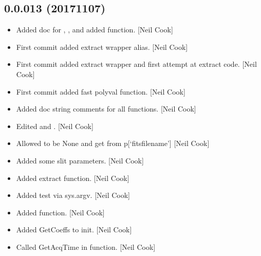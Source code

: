 \documentclass[a4paper,10pt,english]{report}
\begin{document}
\subsection{0.0.013 (2017\sphinxhyphen{}11\sphinxhyphen{}07)}
\label{\detokenize{misc/changelog:id557}}\begin{itemize}
\item {} 
Added doc for , ,
 and  added
 function. {[}Neil Cook{]}

\item {} 
First commit \sphinxhyphen{} added extract wrapper alias. {[}Neil Cook{]}

\item {} 
First commit \sphinxhyphen{} added extract wrapper and first attempt at extract
code. {[}Neil Cook{]}

\item {} 
First commit \sphinxhyphen{} added fast polyval function. {[}Neil Cook{]}

\item {} 
Added doc string comments for all functions. {[}Neil Cook{]}

\item {} 
Edited  and . {[}Neil Cook{]}

\item {} 
Allowed  to be None and get  from p{[}‘fitsfilename’{]}
{[}Neil Cook{]}

\item {} 
Added some slit parameters. {[}Neil Cook{]}

\item {} 
Added extract function. {[}Neil Cook{]}

\item {} 
Added test via sys.argv. {[}Neil Cook{]}

\item {} 
Added  function. {[}Neil Cook{]}

\item {} 
Added GetCoeffs to init. {[}Neil Cook{]}

\item {} 
Called GetAcqTime in  function. {[}Neil Cook{]}


\end{itemize}
\end{document}
